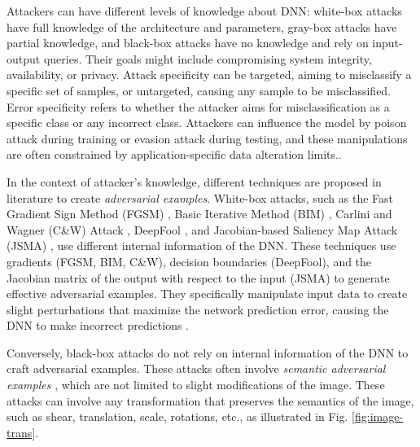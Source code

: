 Attackers can have different levels of knowledge about DNN: white-box attacks have full knowledge of the architecture and parameters, gray-box attacks have partial knowledge, and black-box attacks have no knowledge and rely on input-output queries. Their goals might include compromising system integrity, availability, or privacy. Attack specificity can be targeted, aiming to misclassify a specific set of samples, or untargeted, causing any sample to be misclassified. 
Error specificity refers to whether the attacker aims for misclassification as a specific class or any incorrect class. Attackers can influence the model by poison attack \cite{poisonattack,Badnets} during training or evasion attack \cite{evasion} during testing, and these manipulations are often constrained by application-specific data alteration limits.\cite{Chakraborty}.

In the context of attacker's knowledge, different techniques are proposed in literature to create \emph{adversarial examples}. White-box attacks, such as the Fast Gradient Sign Method (FGSM) \cite{FGSM}, Basic Iterative Method (BIM) \cite{BIM}, Carlini and Wagner (C\&W) Attack \cite{Carlini}, DeepFool \cite{deepfool}, and Jacobian-based Saliency Map Attack (JSMA) \cite{JSMA}, use different internal information of the DNN. These techniques use gradients (FGSM, BIM, C\&W), decision boundaries (DeepFool), and the Jacobian matrix of the output with respect to the input (JSMA) to generate effective adversarial examples. They specifically manipulate input data to create slight perturbations that maximize the network prediction error, causing the DNN to make incorrect predictions \cite{Hosseini}.

Conversely, black-box attacks do not rely on internal information of the DNN to craft adversarial examples. These attacks often involve \emph{semantic adversarial examples} \cite{HuangX,deeptest,Engstrom,Pei}, which are not limited to slight modifications of the image. These attacks can involve any transformation that preserves the semantics of the image, such as shear, translation, scale, rotations, etc., as illustrated in Fig. \ref{fig:image-trans}.


\begin{center}
  \end{center}

